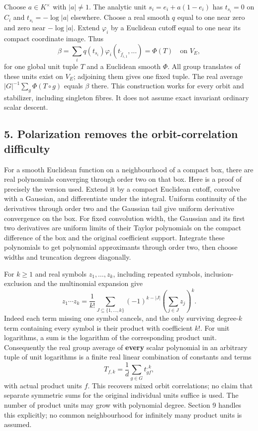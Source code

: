 \documentclass[11pt]{article}
\begin{document}
Choose \(a\in K^\times\) with \(|a|\ne1\). The analytic unit
\(s_i=e_i+a(1-e_i)\) has \(t_{s_i}=0\) on \(C_i\) and
\(t_{s_i}=-\log|a|\) elsewhere. Choose a real smooth \(q\) equal to one
near zero and zero near \(-\log|a|\). Extend \(\varphi_i\) by a
Euclidean cutoff equal to one near its compact coordinate image. Thus \[
 \beta=\sum_i q(t_{s_i})\varphi_i(t_{\widetilde f_{i,1}},\ldots)
                          =\Phi(T)\quad\text{on }V_E,   \tag{8}
\] for one global unit tuple \(T\) and a Euclidean smooth \(\Phi\). All
group translates of these units exist on \(V_E\); adjoining them gives
one fixed tuple. The real average \(|G|^{-1}\sum_g\Phi(T\circ g)\)
equals \(\beta\) there. This construction works for every orbit and
stabilizer, including singleton fibres. It does not assume exact
invariant ordinary scalar descent.

\subsection{5. Polarization removes the orbit-correlation
difficulty}\label{polarization-removes-the-orbit-correlation-difficulty}

For a smooth Euclidean function on a neighbourhood of a compact box,
there are real polynomials converging through order two on that box.
Here is a proof of precisely the version used. Extend it by a compact
Euclidean cutoff, convolve with a Gaussian, and differentiate under the
integral. Uniform continuity of the derivatives through order two and
the Gaussian tail give uniform derivative convergence on the box. For
fixed convolution width, the Gaussian and its first two derivatives are
uniform limits of their Taylor polynomials on the compact difference of
the box and the original coefficient support. Integrate these
polynomials to get polynomial approximants through order two, then
choose widths and truncation degrees diagonally.

For \(k\ge1\) and real symbols \(z_1,\ldots,z_k\), including repeated
symbols, inclusion-exclusion and the multinomial expansion give \[
 z_1\cdots z_k=\frac1{k!}\sum_{J\subseteq\{1,\ldots,k\}}
            (-1)^{k-|J|}\left(\sum_{j\in J}z_j\right)^k. \tag{9}
\] Indeed each term missing one symbol cancels, and the only surviving
degree-\(k\) term containing every symbol is their product with
coefficient \(k!\). For unit logarithms, a sum is the logarithm of the
corresponding product unit. Consequently the real group average of
\textbf{every} scalar polynomial in an arbitrary tuple of unit
logarithms is a finite real linear combination of constants and terms \[
        T_{f,k}=\frac1d\sum_{g\in G}t_{gf}^{,k},          \tag{10}
\] with actual product units \(f\). This recovers mixed orbit
correlations; no claim that separate symmetric sums for the original
individual units suffice is used. The number of product units may grow
with polynomial degree. Section 9 handles this explicitly; no common
neighbourhood for infinitely many product units is assumed.
\end{document}
